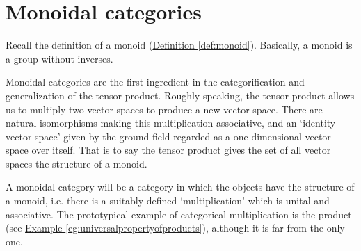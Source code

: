 \documentclass[a4paper]{report}
\theoremstyle{definition}
\theoremstyle{plain}
\theoremstyle{remark}
\begin{document}
\section{Monoidal categories} \label{sec:monoidalcategories}
Recall the definition of a monoid (\hyperref[def:monoid]{Definition \ref*{def:monoid}}). Basically, a monoid is a group without inverses. 

Monoidal categories are the first ingredient in the categorification and generalization of the tensor product. Roughly speaking, the tensor product allows us to multiply two vector spaces to produce a new vector space. There are natural isomorphisms making this multiplication associative, and an `identity vector space' given by the ground field regarded as a one-dimensional vector space over itself. That is to say the tensor product gives the set of all vector spaces the structure of a monoid.

A monoidal category will be a category in which the objects have the structure of a monoid, i.e. there is a suitably defined `multiplication' which is unital and associative. The prototypical example of categorical multiplication is the product (see \hyperref[eg:universalpropertyofproducts]{Example \ref*{eg:universalpropertyofproducts}}), although it is far from the only one.
\end{document}

